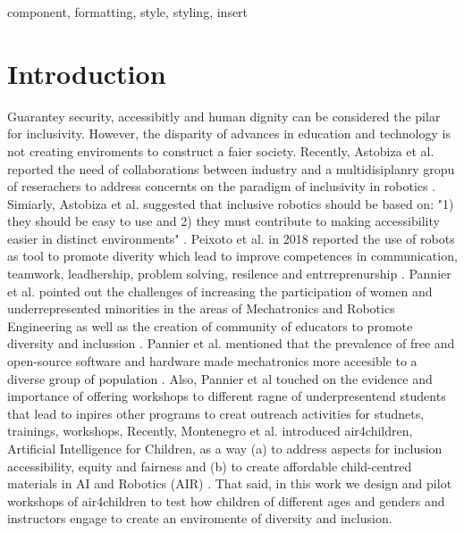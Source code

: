 \documentclass[conference]{IEEEtran}
\begin{document}
\maketitle

\begin{abstract}
This document is a model and instructions for \LaTeX.
This and the IEEEtran.cls file define the components of your paper [title, text, heads, etc.]. 
*CRITICAL: Do Not Use Symbols, Special Characters, Footnotes, or Math in Paper Title or Abstract.
\lipsum[2]
\end{abstract}

\begin{IEEEkeywords}
component, formatting, style, styling, insert
\end{IEEEkeywords}

\section{Introduction}
Guarantey security, accessibitly and human dignity can be considered the pilar for inclusivity.
However, the disparity of advances in education and technology is not creating enviroments to construct a faier society.
Recently, Astobiza et al. reported the need of collaborations between industry and a multidisiplanry gropu of reserachers to address concernts on the paradigm of inclusivity in robotics \cite{MonasterioAstobiza2019}.
Simiarly, Astobiza et al. suggested that inclusive robotics should be based on: "1) they should be easy to use and 2) they must contribute to making accessibility easier in distinct environments" \cite{MonasterioAstobiza2019}.
Peixoto et al. in 2018 reported the use of robots as tool to promote diverity which lead to improve competences in communication, teamwork, leadhership, problem solving, resilence and entrreprenurship \cite{PeixotoCastro2018, PeixotoGonzalez2018}. 
Pannier et al. pointed out the challenges of increasing the  participation of women and underrepresented minorities in the areas of Mechatronics and Robotics Engineering as well as the creation of community of educators to promote diversity and inclussion \cite{Pannier2020}.
Pannier et al. mentioned that the prevalence of free and open-source software and hardware made mechatronics more accesible to a diverse group of population \cite{Pannier2020}.
Also, Pannier et al touched on the evidence and importance of offering workshops to different ragne of underpresentend students that lead to inpires other programs to creat outreach activities for studnets, trainings, workshops, 
Recently, Montenegro et al. introduced air4children, Artificial Intelligence for Children, as a way  (a) to address aspects for inclusion accessibility, equity and fairness and (b) to create affordable child-centred materials in AI and Robotics (AIR) \cite{montenegro2021air4children}. 
That said, in this work we design and pilot workshops of air4children to test how children of different ages and genders and instructors engage to create an enviromente of diversity and inclusion. 
\end{document}
